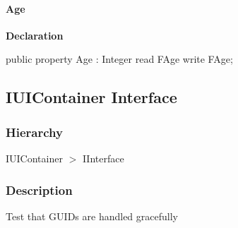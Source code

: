 \documentclass{report}
\begin{document}
\paragraph*{Age}\hspace*{\fill}

\begin{list}{}{
\setlength{\itemindent}{0cm}
\setlength{\listparindent}{0cm}
\setlength{\leftmargin}{\evensidemargin}
\addtolength{\leftmargin}{\tmplength}
\settowidth{\labelsep}{X}
\addtolength{\leftmargin}{\labelsep}
\setlength{\labelwidth}{\tmplength}
}
\begin{flushleft}
\item[\textbf{Declaration}\hfill]
\begin{ttfamily}
public property Age : Integer read FAge write FAge;\end{ttfamily}


\end{flushleft}
\end{list}
\subsection*{IUIContainer Interface}
\subsubsection*{\large{\textbf{Hierarchy}}\normalsize\hspace{1ex}\hfill}
IUIContainer {$>$} IInterface
\subsubsection*{\large{\textbf{Description}}\normalsize\hspace{1ex}\hfill}
Test that GUIDs are handled gracefully
\end{document}
